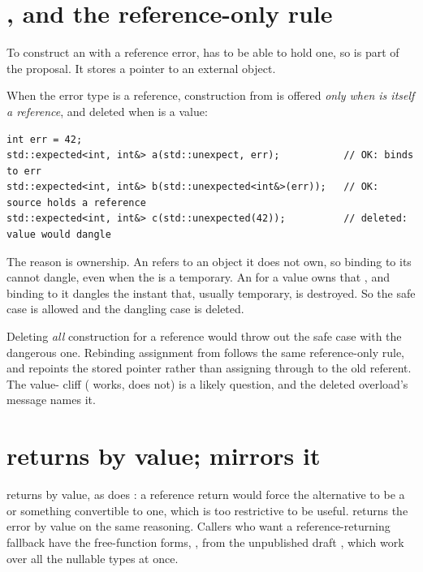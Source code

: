 \documentclass[a4paper,10pt,oneside,openany,final,article]{memoir}
\begin{document}
\section{, and the reference-only rule}

To construct an  with a reference error,  has
to be able to hold one, so  is part of the proposal. It
stores a pointer to an external object.

When the error type is a reference, construction from  is
offered \emph{only when  is itself a reference}, and deleted when
 is a value:

\begin{verbatim}
int err = 42;
std::expected<int, int&> a(std::unexpect, err);           // OK: binds to err
std::expected<int, int&> b(std::unexpected<int&>(err));   // OK: source holds a reference
std::expected<int, int&> c(std::unexpected(42));          // deleted: value would dangle
\end{verbatim}

The reason is ownership. An  refers to an object it does
not own, so binding  to its  cannot dangle, even when
the  is a temporary. An  for a value
 owns that , and binding  to it dangles the instant
that, usually temporary,  is destroyed. So the safe case
is allowed and the dangling case is deleted.

Deleting \emph{all}  construction for a reference
 would throw out the safe  case with the
dangerous one. Rebinding
assignment from  follows the same reference-only rule,
and repoints the stored pointer rather than assigning through to the old
referent. The value- cliff ( works,
 does not) is a likely question, and the deleted
overload's message names it.

\section{ returns by value;  mirrors it}

 returns  by value, as
 does \cite{P2988R12}: a reference return would
force the alternative to be a  or something convertible to one, which
is too restrictive to be useful.  returns the error by value on
the same reasoning. Callers who want a reference-returning fallback
have the free-function forms, , from the unpublished draft
\cite{D4270R0}, which work over all the nullable types at once.
\end{document}

